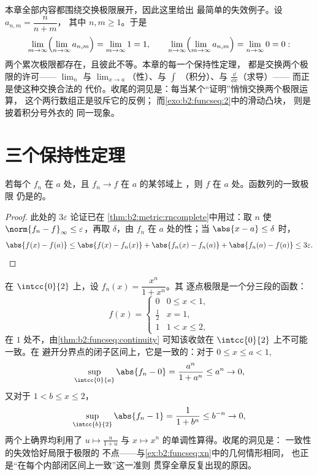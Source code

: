 \begin{example}[两个不可交换的极限]\label{ex:b2:funcseq:doublelimit}
本章全部内容都围绕交换极限展开，因此这里给出
最简单的失效例子。设 $a_{n,m} = \dfrac{n}{n+m}$，
其中 $n, m \geq 1$。于是
\[
\lim_{m\to\infty}\Bigl(\lim_{n\to\infty}a_{n,m}\Bigr)
= \lim_{m\to\infty} 1 = 1,
\qquad
\lim_{n\to\infty}\Bigl(\lim_{m\to\infty}a_{n,m}\Bigr)
= \lim_{n\to\infty} 0 = 0 :
\]
两个累次极限都存在，且彼此不等。本章的每一个保持性定理，
都是交换两个极限的许可——
$\lim_n$ 与 $\lim_{x\to a}$（性）、与 $\int$
（积分）、与 $\frac{\dd}{\dd x}$（求导）——
而正是使这种交换合法的
代价。收尾的洞见是：每当某个“证明”悄悄交换两个极限运算，
这个两行数组正是驳斥它的反例；
而\cref{exo:b2:funcseq:2}中的滑动凸块，
则是披着积分号外衣的
同一现象。
\end{example}

\section{三个保持性定理}

\begin{theorem}[连续性]\label{thm:b2:funcseq:continuity}
若每个 $f_n$ 在 $a$ 处，且 $f_n \to f$ 在 $a$ 的某邻域上
，则 $f$ 在 $a$ 处。函数列的一致极限
仍是的。
\end{theorem}

\begin{proof}
此处的 $3\varepsilon$ 论证已在
\cref{thm:b2:metric:rncomplete}中用过：取 $n$ 使 $\norm{f_n -
f}_\infty \leq \varepsilon$，再取 $\delta$，由
$f_n$ 在 $a$ 处的性；当 $\abs{x - a} \leq \delta$ 时，
\[
\abs{f(x) - f(a)} \leq \abs{f(x) - f_n(x)} + \abs{f_n(x) - f_n(a)}
+ \abs{f_n(a) - f(a)} \leq 3\varepsilon . \qedhere
\]
\end{proof}

\begin{example}[一致性恰在极限断裂处失效]\label{ex:b2:funcseq:threshold}
在 $\intcc{0}{2}$ 上，设 $f_n(x) = \dfrac{x^n}{1 + x^n}$。其
逐点极限是一个分三段的函数：
\[
f(x) = \begin{cases} 0 & 0 \leq x < 1,\\[2pt]
\tfrac12 & x = 1,\\[2pt]
1 & 1 < x \leq 2, \end{cases}
\]
在 $1$ 处不，由\cref{thm:b2:funcseq:continuity}
可知该收敛在 $\intcc{0}{2}$ 上不可能一致。在
避开分界点的闭子区间上，它是一致的：对于 $0 \leq x \leq
a < 1$,
\[
\sup_{\intcc{0}{a}}\abs{f_n - 0}
= \frac{a^n}{1 + a^n} \leq a^n \to 0 ,
\]
又对于 $1 < b \leq x \leq 2$，
\[
\sup_{\intcc{b}{2}}\abs{f_n - 1}
= \frac{1}{1 + b^n} \leq b^{-n} \to 0 ,
\]
两个上确界均利用了 $u \mapsto
\frac{u}{1+u}$ 与 $x \mapsto x^n$ 的单调性算得。收尾的洞见是：
一致性的失效恰好局限于极限的
不点——与\cref{ex:b2:funcseq:xn}中的几何情形相同，
也正是“在每个内部闭区间上一致”这一准则
贯穿全章反复出现的原因。
\end{example}

